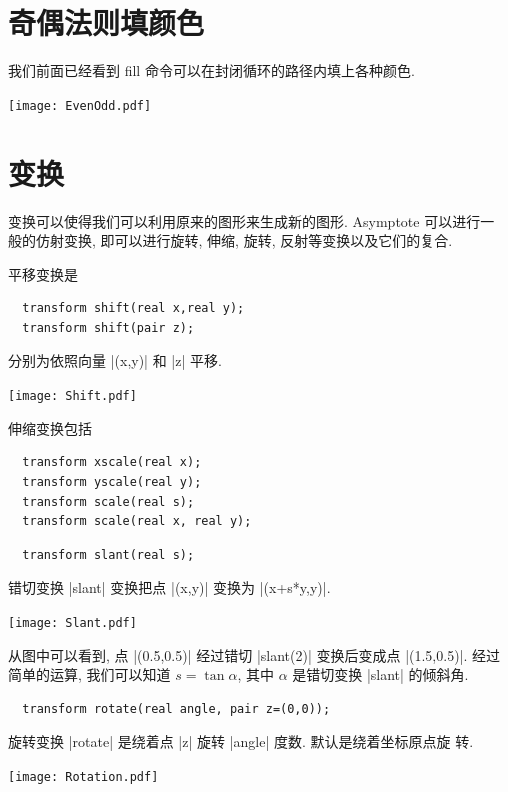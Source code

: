 \documentclass[nofonts,CJKnormalspaces]{ctexbook}[2009/05/20]
\begin{document}
\section{奇偶法则填颜色}

我们前面已经看到 {fill} 命令可以在封闭循环的路径内填上各种颜色.
\begin{center}\texttt{[image: EvenOdd.pdf]}\end{center}%

\section{变换}
变换可以使得我们可以利用原来的图形来生成新的图形. Asymptote 可以进行一
般的仿射变换, 即可以进行旋转, 伸缩, 旋转, 反射等变换以及它们的复合.

平移变换是
\begin{lstlisting}
  transform shift(real x,real y);
  transform shift(pair z);
\end{lstlisting}
分别为依照向量 |(x,y)| 和 |z| 平移.

\begin{center}\texttt{[image: Shift.pdf]}\end{center}%


伸缩变换包括
\begin{lstlisting}
  transform xscale(real x);
  transform yscale(real y);
  transform scale(real s);
  transform scale(real x, real y);
\end{lstlisting}

\begin{lstlisting}
  transform slant(real s);
\end{lstlisting}

错切变换 |slant| 变换把点 |(x,y)| 变换为 |(x+s*y,y)|.
\begin{center}\texttt{[image: Slant.pdf]}\end{center}%

从图中可以看到, 点 |(0.5,0.5)| 经过错切 |slant(2)| 变换后变成点
|(1.5,0.5)|. 经过简单的运算, 我们可以知道 $s=\tan\alpha$, 其中
$\alpha$ 是错切变换 |slant| 的倾斜角.

\begin{lstlisting}
  transform rotate(real angle, pair z=(0,0));
\end{lstlisting}
旋转变换 |rotate| 是绕着点 |z| 旋转 |angle| 度数. 默认是绕着坐标原点旋
转.
\begin{center}\texttt{[image: Rotation.pdf]}\end{center}%

\end{document}

